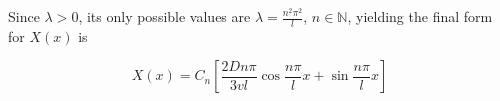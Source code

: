 \documentclass[a4paper, 10pt]{article}
\begin{document}
  Since $\lambda > 0$, its only possible values are $\lambda = \frac{n^2
  \pi^2}{l}$, $n \in \mathbb{N}$, yielding the final form for $X(x)$ is

  \begin{equation}
    X(x) = C_n \left[\frac{2 D n \pi}{3vl} \cos \frac{n \pi}{l}x + \sin \frac{n
    \pi}{l}x\right]
  \end{equation}



  \printbibliography
\end{document}
